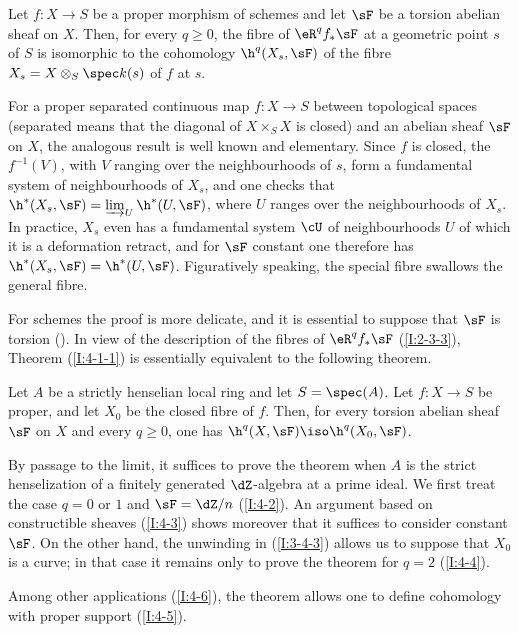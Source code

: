 \begin{theorem}\label{I:4-1-1}
Let $f:X\to S$ be a proper morphism of schemes and let $\sF$ be a
torsion abelian sheaf on $X$. Then, for every $q\geqslant0$, the fibre
of $\eR^qf_*\sF$ at a geometric point $s$ of $S$ is isomorphic to the
cohomology $\h^q(X_s,\sF)$ of the fibre
$X_s=X\otimes_S\spec k(s)$ of $f$ at $s$.
\end{theorem}

For a proper separated continuous map $f:X\to S$ between topological
spaces (separated means that the diagonal of $X\times_SX$ is closed) and
an abelian sheaf $\sF$ on $X$, the analogous result is well known and
elementary. Since $f$ is closed, the $f^{-1}(V)$, with $V$ ranging over
the neighbourhoods of $s$, form a fundamental system of neighbourhoods
of $X_s$, and one checks that
$\h^*(X_s,\sF)=\varinjlim_U\h^*(U,\sF)$, where $U$ ranges
over the neighbourhoods of $X_s$. In practice, $X_s$ even has a
fundamental system $\cU$ of neighbourhoods $U$ of which it is a
deformation retract, and for $\sF$ constant one therefore has
$\h^*(X_s,\sF)=\h^*(U,\sF)$. Figuratively speaking, the
special fibre swallows the general fibre.

For schemes the proof is more delicate, and it is essential to suppose
that $\sF$ is torsion (). In view of the description of
the fibres of $\eR^qf_*\sF$ (\ref{I:2-3-3}), Theorem
(\ref{I:4-1-1}) is essentially equivalent to the following theorem.

\begin{theorem}\label{I:4-1-2}
Let $A$ be a strictly henselian local ring and let $S=\spec(A)$. Let
$f:X\to S$ be proper, and let $X_0$ be the closed fibre of $f$. Then, for every
torsion abelian sheaf $\sF$ on $X$ and every $q\geqslant0$, one has
$\h^q(X,\sF)\iso\h^q(X_0,\sF)$.
\end{theorem}

By passage to the limit, it suffices to prove the theorem when $A$ is the
strict henselization of a finitely generated $\dZ$-algebra at a prime
ideal. We first treat the case $q=0$ or $1$ and $\sF=\dZ/n$
(\ref{I:4-2}). An argument based on constructible sheaves (\ref{I:4-3})
shows moreover that it suffices to consider constant $\sF$. On the other
hand, the unwinding in (\ref{I:3-4-3}) allows us to suppose that $X_0$
is a curve; in that case it remains only to prove the theorem for $q=2$
(\ref{I:4-4}).

Among other applications (\ref{I:4-6}), the theorem allows one to define
cohomology with proper support (\ref{I:4-5}).

